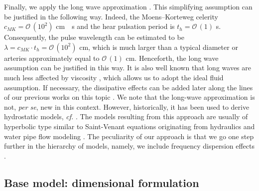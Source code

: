 \documentclass[alpha-refs, 12pt]{wiley-article}
\renewcommand{\O}{\mathcal{O}}
\begin{document}
Finally, we apply the long wave approximation \citep{Dutykh2007, Khakimzyanov2019}. This simplifying assumption can be justified in the following way. Indeed, the Moens--Korteweg celerity $c_{MK} = \O\,(10^2)$ \si{cm \per s} \citep{Tijsseling2012, Lagree2000} and the hear pulsation period is $t_{h} = \O\,(1)$ \si{s}. Consequently, the pulse wavelength can be estimated to be $\lambda = c_{MK}\cdot t_{h} = \O\,(10^2)$ \si{cm}, which is much larger than a typical diameter or arteries approximately equal to $\O\,(1)$ \si{cm}. Henceforth, the long wave assumption can be justified in this way. It is also well known that long waves are much less affected by viscosity \citep{Boussinesq1895, Lamb1932, Dutykh2007}, which allows us to adopt the ideal fluid assumption. If necessary, the dissipative effects can be added later along the lines of our previous works on this topic \citep{DutykhDias2007, Dutykh2008a, Dutykh2009c, Mitsotakis2019}. We note that the long-wave approximation is not, \emph{per se}, new in this context. However, historically, it has been used to derive hydrostatic models, \emph{cf.} \cite{Lambert1958, Formaggia2003, Quarteroni2004, Delestre2013}. The models resulting from this approach are usually of hyperbolic type similar to Saint-Venant equations originating from hydraulics and water pipe flow modeling \citep{Bourdarias2007a, Bourdarias2007, Bourdarias2012}. The peculiarity of our approach is that we go one step further in the hierarchy of models, namely, we include frequency dispersion effects \citep{Khakimzyanov2016c}.

\subsection{Base model: dimensional formulation}
\end{document}
